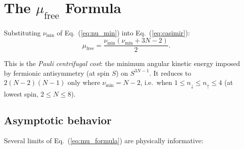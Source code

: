 \documentclass[aps,prl,twocolumn,superscriptaddress,longbibliography]{revtex4-2}
\newcommand{\mufree}{\mu_{\mathrm{free}}}
\begin{document}


\section{The $\mufree$ Formula}
\label{sec:mu_formula}

Substituting $\nu_{\min}$ of Eq.~(\ref{eq:nu_min}) into
Eq.~(\ref{eq:casimir}):
\begin{equation}
  \mufree = \frac{\nu_{\min}(\nu_{\min} + 3N - 2)}{2}.
  \label{eq:mu_formula}
\end{equation}

This is the \emph{Pauli centrifugal cost}: the minimum angular kinetic
energy imposed by fermionic antisymmetry (at spin $S$) on $S^{3N-1}$.
It reduces to $2(N-2)(N-1)$ only where $\nu_{\min} = N-2$, i.e.\ when
$1 \le n_\downarrow \le n_\uparrow \le 4$ (at lowest spin,
$2 \le N \le 8$).

\subsection{Asymptotic behavior}
\label{sec:asymptotic}

Several limits of Eq.~(\ref{eq:mu_formula}) are physically
informative:
\end{document}
